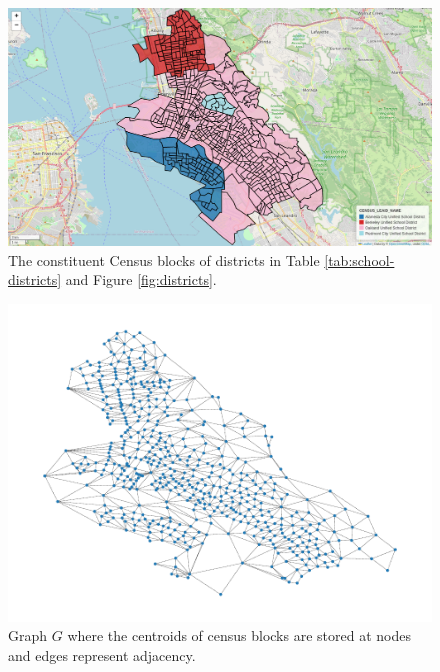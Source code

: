 \documentclass{article}
\begin{document}
\begin{figure}[H]
    \centering
    \includegraphics[width=\textwidth]{figure/districts_cb.png}
    \caption{The constituent Census blocks of districts in Table \ref{tab:school-districts} and Figure \ref{fig:districts}.}
    \label{fig:districts-census-blocks}
\end{figure}

\begin{figure}[H]
    \centering
    \includegraphics[width=0.8\linewidth]{figure/graph-data.pdf}
    \caption{Graph \(G\) where the centroids of census blocks are stored at nodes and edges represent adjacency.}
    \label{fig:graph-data}
\end{figure}
\end{document}
